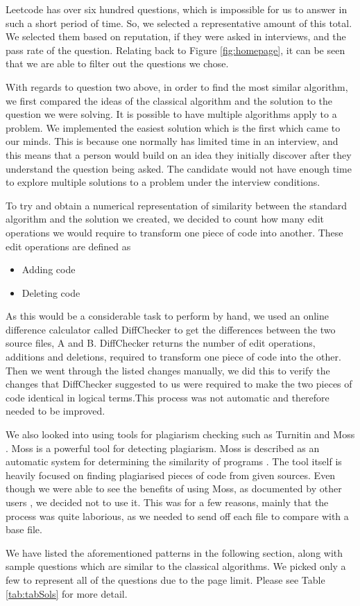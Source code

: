 \documentclass[10pt,twocolumn]{IEEEtran}
\begin{document}
\par Leetcode has over six hundred questions, which is impossible for us to answer in such a short period of time. So, we selected a representative amount of this total. We selected them based on reputation, if they were asked in interviews, and the pass rate of the question. Relating back to Figure \ref{fig:homepage}, it can be seen that we are able to filter out the questions we chose.
\par With regards to question two above, in order to find the most similar algorithm, we first compared the ideas of the classical algorithm and the solution to the question we were solving. It is possible to have multiple algorithms apply to a problem. We implemented the easiest solution which is the first which came to our minds. This is because one normally has limited time in an interview, and this means that a person would build on an idea they initially discover after they understand the question being asked. The candidate would not have enough time to explore multiple solutions to a problem under the interview conditions. 
\par To try and obtain a numerical representation of similarity between the standard algorithm and the solution we created, we decided to count how many edit operations we would require to transform one piece of code into another. These edit operations are defined as 
\begin{itemize}
\item Adding code
\item Deleting code
\end{itemize}
As this would be a considerable task to perform by hand, we used an online difference calculator called DiffChecker \cite{diff} to get the differences between the two source files, A and B. DiffChecker returns the number of edit operations, additions and deletions, required to transform one piece of code into the other. Then we went through the listed changes manually, we did this to verify the changes that DiffChecker suggested to us were required to make the two pieces of code identical in logical terms.This process was not automatic and therefore needed to be improved. \par We also looked into using tools for plagiarism checking such as Turnitin and Moss \cite{Schleimer:2003:WLA:872757.872770}. Moss is a powerful tool for detecting plagiarism. Moss is described as an automatic system for determining the similarity of programs \cite{mosswebsite}. The tool itself is heavily focused on finding plagiarised pieces of code from given sources. Even though we were able to see the benefits of using Moss, as documented by other users \cite{MossBowyer}, we decided not to use it. This was for a few reasons, mainly that the process was quite laborious, as we needed to send off each file to compare with a base file. 
\par We have listed the aforementioned patterns in the following section, along with sample questions which are similar to the classical algorithms. We picked only a few to represent all of the questions due to the page limit. Please see Table \ref{tab:tabSols} for more detail.
\end{document}
